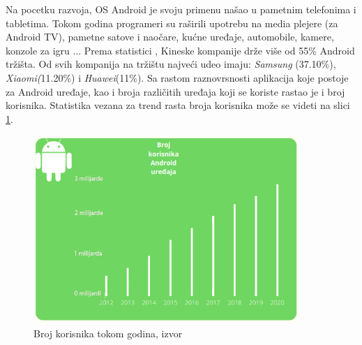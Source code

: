 \documentclass[android.tex]{subfiles}
\begin{document}
Na pocetku razvoja, OS Android je svoju primenu našao u pametnim telefonima i tabletima. Tokom godina programeri su raširili upotrebu na media plejere (za Android TV), pametne satove i naočare, kućne uređaje, automobile, kamere, konzole za igru \cite{sajt:androidDevelopers}...   Prema statistici \cite{sajt:statistika}, Kineske kompanije drže više od 55\% Android tržišta. Od svih kompanija na tržištu najveći udeo imaju:\textit{ Samsung} (37.10\%), \textit{Xiaomi(}11.20\%) i \textit{Huawei}(11\%). Sa rastom raznovrsnosti aplikacija koje postoje za Android uređaje, kao i broja različitih uređaja koji se koriste rastao je i broj korisnika. Statistika vezana za trend rasta broja korisnika može se videti na slici \ref{fig:brKorisnika}.

\begin{figure}[!ht]
  \centering
  \label{fig:brKorisnika}
  \includegraphics[width=0.9\textwidth]{brKorisnika.jpg}
  \caption{Broj korisnika tokom godina, izvor \cite{sajt:statistika}}
\end{figure}
\end{document}
